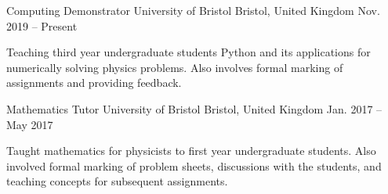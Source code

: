 
\begin{cventries}

    \cventry
      {Computing Demonstrator} %
      {University of Bristol} %
      {Bristol, United Kingdom} %
      {Nov. 2019 -- Present} %
      {
        \begin{cvitems} %
          \item{Teaching third year undergraduate students Python and its applications for numerically solving physics problems. Also involves formal marking of assignments and providing feedback.}
        \end{cvitems}
      }

    \cventry
      {Mathematics Tutor} %
      {University of Bristol} %
      {Bristol, United Kingdom} %
      {Jan. 2017 -- May 2017} %
      {
        \begin{cvitems} %
          \item{Taught mathematics for physicists to first year undergraduate students. Also involved formal marking of problem sheets, discussions with the students, and teaching concepts for subsequent assignments.}
        \end{cvitems}
      }

\end{cventries}
